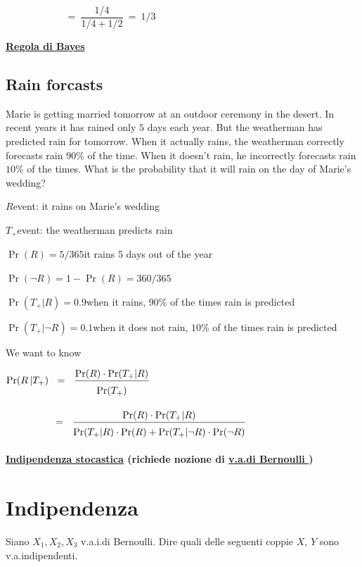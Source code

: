\documentclass[11pt,openany]{book}
\begin{document}
$\phantom{\Pr(C|S_{na})}\ =\ \dfrac{1/4}{1/4+1/2}\ =\ 1/3$


\hfill{}\clearpage\hfill
\textbf{{\color{brown}\hyperref[RegolaBayes]{Regola di Bayes} \faShare}}
\subsection{Rain forcasts}
\label{rain_desert}

Marie is getting married tomorrow at an outdoor ceremony in the desert. In recent years it has rained only $5$ days each year. But the weatherman has predicted rain for tomorrow. When it actually rains, the weatherman correctly forecasts rain $90\%$ of the time. When it doesn’t rain, he incorrectly forecasts rain $10\%$ of the times. What is the probability that it will rain on the day of Marie’s wedding?


$R$\hfill event: it rains on Marie’s wedding

$T_+$\hfill event: the weatherman predicts rain

$\Pr(R) = 5/365$\hfill it rains 5 days out of the year

$\Pr(\neg R) = 1-\Pr(R)= 360/365$

$\Pr(T_+|R) = 0.9$\hfill when it rains, $90\%$ of the times rain is predicted

$\Pr(T_+|\neg R) = 0.1$\hfill when it does not rain, $10\%$ of the times rain is predicted

\bigskip
We want to know

$\displaystyle \Pr(R\,| T_+)\medrel{=}\frac{\Pr(R)\cdot \Pr(T_+|R)}{\Pr(T_+)\vphantom{\Big[}}$

$\displaystyle\hphantom{\Pr(R | T_+)}\medrel{=}\frac{\Pr(R)\cdot \Pr(T_+|R)}{\Pr(T_+|R)\cdot \Pr(R)+ \Pr(T_+|\neg R)\cdot \Pr(\neg R)\vphantom{\Big[}}$


\hfill{}\clearpage\hfill
\textbf{{\color{brown}\hyperref[indipendenza]{Indipendenza stocastica} \faShare} (richiede nozione di \hyperref[Bernoulli]{v.a.\@ di Bernoulli \faShare})}
\section{Indipendenza}
\label{esercizio_indipendenza}

Siano $X_1,X_2,X_3$ v.a.i.\@ di Bernoulli. Dire quali delle seguenti coppie $X$, $Y$ sono v.a.\@ indipendenti.\medskip

\def\medrel#1{\parbox[t]{6ex}{$\displaystyle\hfil #1$}}
\def\ceq#1#2#3{\parbox[t]{15ex}{$\displaystyle #1$}\medrel{#2}$\displaystyle  #3$}
\end{document}
